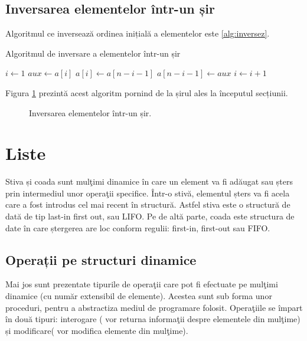 \subsection{Inversarea elementelor într-un șir}

Algoritmul ce inversează ordinea inițială a elementelor este \ref{alg:inversez}.


\begin{algorithm}[H]
	\caption{Algoritmul de inversare a elementelor într-un șir} \label{alg:inversez}
	\begin{algorithmic}[1]
		\State $i \gets 1$	
		\State $aux \gets a[i]$
		\State $a[i] \gets a[n-i-1]$
		\State $ a[n-i-1] \gets aux$
		\State $i \gets i+1$		
		\EndWhile 
		\EndProcedure
	\end{algorithmic}
\end{algorithm}

Figura \ref{fig:inversare} prezintă acest algoritm pornind de la șirul ales la începutul secțiunii.

\begin{figure}[H] 
	\centering	
	{
	}
	\caption{Inversarea elementelor într-un șir.} 
	\label{fig:inversare}
\end{figure}

\section{Liste}

Stiva și coada sunt mulţimi dinamice în care un element va fi adăugat sau șters prin intermediul unor operaţii specifice. Într-o stivă, elementul șters va fi acela care a fost introdus cel mai recent în structură. Astfel stiva este o structură de dată de tip last-in first out, sau LIFO. Pe de altă parte, coada este structura de date în care ștergerea are loc conform regulii: first-in, first-out sau FIFO.

\subsection{Operații pe structuri dinamice}

Mai jos sunt prezentate tipurile de operaţii care pot fi efectuate pe mulţimi dinamice (cu număr extensibil de elemente). Acestea sunt sub forma unor proceduri, pentru a abstractiza mediul de programare folosit. Operaţiile se împart în două tipuri: interogare ( vor returna informaţii despre elementele din mulţime) și modificare( vor modifica elemente din mulţime).

